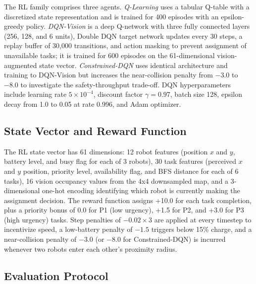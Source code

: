 \documentclass[conference]{IEEEtran}
\begin{document}
The RL family comprises three agents.
\textit{Q-Learning} uses a tabular Q-table with a discretized state representation and is trained for 400 episodes with an epsilon-greedy policy.
\textit{DQN-Vision} is a deep Q-network with three fully connected layers (256, 128, and 6 units), Double DQN target network updates every 30 steps, a replay buffer of 30,000 transitions, and action masking to prevent assignment of unavailable tasks; it is trained for 600 episodes on the 61-dimensional vision-augmented state vector.
\textit{Constrained-DQN} uses identical architecture and training to DQN-Vision but increases the near-collision penalty from $-3.0$ to $-8.0$ to investigate the safety-throughput trade-off.
DQN hyperparameters include learning rate $5 \times 10^{-4}$, discount factor $\gamma = 0.97$, batch size 128, epsilon decay from 1.0 to 0.05 at rate 0.996, and Adam optimizer.

\subsection{State Vector and Reward Function}

The RL state vector has 61 dimensions: 12 robot features (position $x$ and $y$, battery level, and busy flag for each of 3 robots), 30 task features (perceived $x$ and $y$ position, priority level, availability flag, and BFS distance for each of 6 tasks), 16 vision occupancy values from the 4x4 downsampled map, and a 3-dimensional one-hot encoding identifying which robot is currently making the assignment decision.
The reward function assigns +10.0 for each task completion, plus a priority bonus of 0.0 for P1 (low urgency), +1.5 for P2, and +3.0 for P3 (high urgency) tasks.
Step penalties of $-0.02 \times 3$ are applied at every timestep to incentivize speed, a low-battery penalty of $-1.5$ triggers below 15\% charge, and a near-collision penalty of $-3.0$ (or $-8.0$ for Constrained-DQN) is incurred whenever two robots enter each other's proximity radius.

\subsection{Evaluation Protocol}
\end{document}
